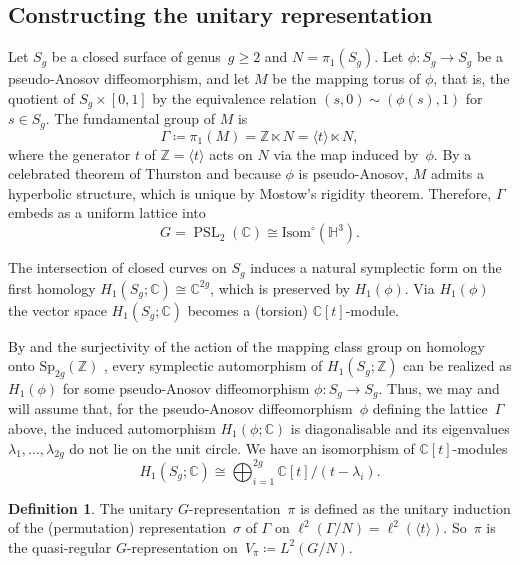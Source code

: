 \documentclass[12pt,reqno]{amsart}
\newcommand{\Z}{\mathbb{Z}}
\newcommand{\C}{\mathbb{C}}
\theoremstyle{definition}
\newtheorem{definition}[theorem]{Definition}
\newcommand{\PSL}{\operatorname{PSL}}
\begin{document}
\subsection{Constructing the unitary representation}\label{subsec:constructing the unitary rep}

Let $S_g$ be a closed surface of genus~$g \geq 2$ and $N = \pi_1(S_g)$. Let $\phi\colon S_g\to S_g$ be a pseudo-Anosov diffeomorphism, and let $M$ be the mapping torus of $\phi$, that is, the quotient of $S_g\times [0,1]$ by the equivalence relation $(s,0)\sim (\phi(s),1)$ for $s\in S_g$.
The fundamental group of $M$ is \[\Gamma\coloneqq\pi_1(M) = \Z \ltimes N=\langle t\rangle\ltimes N,\] where the generator $t$ of $\Z=\langle t\rangle$ acts on $N$ via the map induced by~$\phi$. By a celebrated theorem of Thurston \cite[Theorem~13.4]{Farb-Margalit} and because $\phi$ is pseudo-Anosov, $M$ admits a hyperbolic structure, which is unique by Mostow's rigidity theorem. Therefore, $\Gamma$ embeds as a uniform lattice into \[G=\PSL_2(\C) \cong \mathrm{Isom}^\circ(\mathbb{H}^3).\]

The intersection of closed curves on $S_g$ induces a natural symplectic form on the first homology $H_1(S_g;\C)\cong \C^{2g}$, which is preserved by $H_1(\phi)$. Via $H_1(\phi)$ the vector space $H_1(S_g;\C)$ becomes a (torsion) $\C[t]$-module. 

By \cite[Theorem~2]{PapadopoulosPseudoAnosov} and the surjectivity of the action of the mapping class group on homology onto $\mathrm{Sp}_{2g}(\Z)$ \cite[Theorem~6.4]{Farb-Margalit}, every symplectic automorphism of $H_1(S_g;\Z)$ can be realized as $H_1(\phi)$ for some pseudo-Anosov diffeomorphism $\phi\colon S_g\to S_g$. Thus, we may and will assume that, for the pseudo-Anosov diffeomorphism~$\phi$ defining the lattice~$\Gamma$ above, the induced automorphism $H_1(\phi;\C)$ is diagonalisable and its eigenvalues $\lambda_1,\dots, \lambda_{2g}$ do not lie on the unit circle. 
We have an isomorphism of $\C[t]$-modules 
\[ H_1(S_g;\C)\cong \bigoplus_{i=1}^{2g} \C[t]/(t-\lambda_i).\]


\begin{definition}\label{def:rep pi}
The unitary $G$-representation~$\pi$ is defined as the unitary induction of the (permutation) representation~$\sigma$ of $\Gamma$ on $\ell^2(\Gamma/N)=\ell^2(\langle t\rangle)$. So~$\pi$ is the quasi-regular $G$-representation on~$V_\pi\coloneqq L^2(G/N)$. 
\end{definition}
\end{document}
